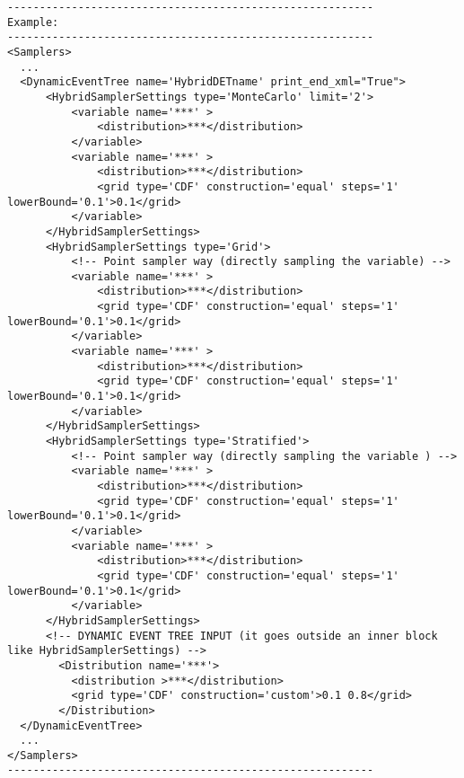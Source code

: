 \begin{lstlisting}[style=XML]
---------------------------------------------------------
Example:
---------------------------------------------------------
<Samplers>
  ...
  <DynamicEventTree name='HybridDETname' print_end_xml="True">
      <HybridSamplerSettings type='MonteCarlo' limit='2'>
          <variable name='***' >
              <distribution>***</distribution>
          </variable>
          <variable name='***' >
              <distribution>***</distribution>
              <grid type='CDF' construction='equal' steps='1' lowerBound='0.1'>0.1</grid>
          </variable>
      </HybridSamplerSettings>
      <HybridSamplerSettings type='Grid'>
          <!-- Point sampler way (directly sampling the variable) -->
          <variable name='***' >
              <distribution>***</distribution>
              <grid type='CDF' construction='equal' steps='1' lowerBound='0.1'>0.1</grid>
          </variable>
          <variable name='***' >
              <distribution>***</distribution>
              <grid type='CDF' construction='equal' steps='1' lowerBound='0.1'>0.1</grid>
          </variable>
      </HybridSamplerSettings>
      <HybridSamplerSettings type='Stratified'>
          <!-- Point sampler way (directly sampling the variable ) -->
          <variable name='***' >
              <distribution>***</distribution>
              <grid type='CDF' construction='equal' steps='1' lowerBound='0.1'>0.1</grid>
          </variable>
          <variable name='***' >
              <distribution>***</distribution>
              <grid type='CDF' construction='equal' steps='1' lowerBound='0.1'>0.1</grid>
          </variable> 
      </HybridSamplerSettings>
      <!-- DYNAMIC EVENT TREE INPUT (it goes outside an inner block like HybridSamplerSettings) -->
        <Distribution name='***'>
          <distribution >***</distribution>
          <grid type='CDF' construction='custom'>0.1 0.8</grid>
        </Distribution>
  </DynamicEventTree>
  ...
</Samplers>
---------------------------------------------------------
\end{lstlisting}

